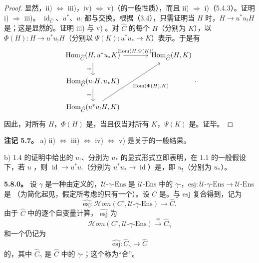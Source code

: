 \begin{proof}
显然，ii) $\Leftrightarrow$ iii)，iv) $\Leftrightarrow$ v)（的一般性质），而且 ii) $\Rightarrow$ i)（5.4.3）。证明 i) $\Rightarrow$ iii)。 $\operatorname{id}_{\widehat C}$、$u^*$、$u_!$ 都与交换。根据（3.4），只需证明当 $H$ 时，$H\to u^*u_!H$ 是；这是显然的。证明 iii) 与 v) 。对 $\widehat C$ 的每个 $H$（分别为 $K$），以 $\Phi(H):H\to u^*u_!H$（分别以 $\Psi(K):u^*u_*\to K$）表示。于是有
\[\begin{tikzcd}[column sep=large]
\operatorname{Hom}_{\widehat C}(H,u^*u_*K)\arrow[r,"{\operatorname{Hom}(H,\Psi(K))}"]\arrow[d,"\sim"']&\operatorname{Hom}_{\widehat C}(H,K)\\
\operatorname{Hom}_{\widehat C}(u_!H,u_*K)\arrow[d,"\sim"']&\\
\operatorname{Hom}_{\widehat C}(u^*u_!H,K)\arrow[uur,"{\operatorname{Hom}(\Phi(H),K)}"']&
\end{tikzcd}.\]
因此，对所有 $H$，$\Phi(H)$ 是，当且仅当对所有 $K$，$\Psi(K)$ 是。证毕。
\end{proof}
\textbf{注记 5.7。} a)  ii) $\Leftrightarrow$ iii) $\Leftrightarrow$ iv) $\Leftrightarrow$ v) 是关于的一般结果。

 b) 1.4 的证明中给出的 $u_!$、分别为 $u_*$ 的显式形式立即表明，在 1.1 的一般假设下，若 $u$ ，则 $\operatorname{id}\to u^*u_!$（分别为 $u^*u_*\to\operatorname{id}$）是，即 $u_!$（分别为 $u_*$）。

\textbf{5.8.0。} 设 $\gamma$ 是一种由定义的，$\mathcal U\text{-}\gamma\text{-}\mathrm{Ens}$ 是 $\mathcal U\text{-}\mathrm{Ens}$ 中的 $\gamma$-，$\mathrm{esj}:\mathcal U\text{-}\gamma\text{-}\mathrm{Ens}\to\mathcal U\text{-}\mathrm{Ens}$ 是
（为简化起见，假定所考虑的只有一个）。设 $C$ 是。与 $\mathrm{esj}$ 复合得到，记为
\[\widehat{\mathrm{esj}}:\mathcal H om(C^\circ,\mathcal U\text{-}\gamma\text{-}\mathrm{Ens})\longrightarrow\widehat C.\]
由于 $\widehat C$ 中的逐个自变量计算， $\widehat{\mathrm{esj}}$ 为
\[\mathcal H om(C^\circ,\mathcal U\text{-}\gamma\text{-}\mathrm{Ens})\xrightarrow{\approx}\widehat C_\gamma\tag{5.8.1}\]
和一个仍记为
\[\widehat{\mathrm{esj}}:\widehat C_\gamma\longrightarrow\widehat C\]
的，其中 $\widehat C_\gamma$ 是 $\widehat C$ 中的 $\gamma$-；这个称为“合”。

